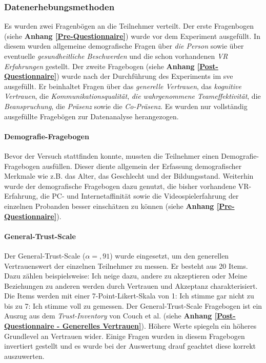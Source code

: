 \documentclass[a4paper,11pt]{article}%
\renewcommand{\\}{\vspace*{0.5\baselineskip} \newline}
\begin{document}
{			\subsubsection{Datenerhebungsmethoden}
Es wurden zwei Fragenbögen an die Teilnehmer verteilt. Der erste Fragenbogen (siehe \textbf{Anhang \ref{Pre-Questionnaire}}) wurde vor dem Experiment ausgefüllt. In diesem wurden allgemeine demografische Fragen über \textit{die Person} sowie über eventuelle \textit{gesundheitliche Beschwerden} und die schon vorhandenen \textit{VR Erfahrungen} gestellt. Der zweite Fragebogen (siehe \textbf{Anhang \ref{Post-Questionnaire}}) wurde nach der Durchführung des Experiments im \ac{sve} ausgefüllt. Er beinhaltet Fragen über das \textit{generelle Vertrauen}, das \textit{kognitive Vertrauen}, die \textit{Kommunikationsqualität}, \textit{die wahrgenommene Teameffektivität}, die \textit{Beanspruchung}, die \textit{Präsenz} sowie die \textit{Co-Präsenz}. 
Es wurden nur vollständig ausgefüllte Fragebögen zur Datenanalyse herangezogen. \\
				
		\paragraph{Demografie-Fragebogen}
Bevor der Versuch stattfinden konnte, mussten die Teilnehmer einen Demografie-Fragebogen ausfüllen. Dieser diente allgemein der Erfassung demografischer Merkmale wie z.B. das Alter, das Geschlecht und der Bildungsstand. Weiterhin wurde der demografische Fragebogen dazu genutzt, die bisher vorhandene VR-Erfahrung, die PC- und Internetaffinität sowie die Videospielerfahrung der einzelnen Probanden besser einschätzen zu können (siehe \textbf{Anhang \ref{Pre-Questionnaire}}).

		\paragraph{General-Trust-Scale}
Der General-Trust-Scale ($\alpha =,91$) \citep{couch1996assessment} wurde eingesetzt, um den generellen Vertrauenswert der einzelnen Teilnehmer zu messen. Er besteht aus 20 Items. Dazu zählen beispielsweise: \glqq{}Ich neige dazu, andere zu akzeptieren\dq{} oder \glqq{}Meine Beziehungen zu anderen werden durch Vertrauen und Akzeptanz charakterisiert\dq{}. Die Items werden mit einer 7-Point-Likert-Skala von 1: \glqq{}Ich stimme gar nicht zu\dq{} bis zu 7: \glqq{}Ich stimme voll zu\dq{} gemessen. Der General-Trust-Scale Fragebogen ist ein Auszug aus dem \textit{Trust-Inventory} von Couch et al. (siehe \textbf{Anhang \ref{Post-Questionnaire - Generelles Vertrauen}}). Höhere Werte spiegeln ein höheres Grundlevel an Vertrauen wider. Einige Fragen wurden in diesem Fragebogen invertiert gestellt und es wurde bei der Auswertung drauf geachtet diese korrekt auszuwerten.

}
\end{document}
